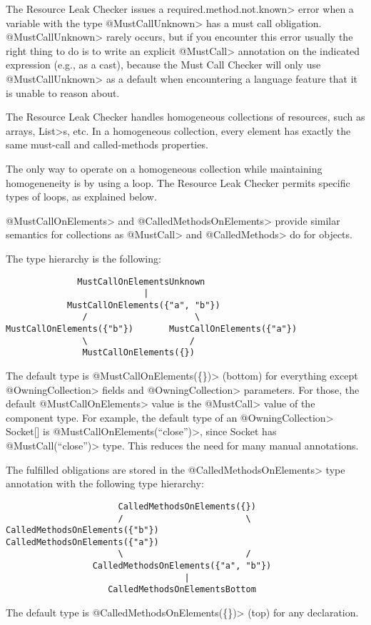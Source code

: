 The Resource Leak Checker issues a \<required.method.not.known> error
when a variable with the type \<@MustCallUnknown> has a must call obligation.
\<@MustCallUnknown> rarely occurs, but if you encounter this error usually
the right thing to do is to write an explicit \<@MustCall> annotation
on the indicated expression (e.g., as a cast), because the Must Call Checker
will only use \<@MustCallUnknown> as a default when encountering a language
feature that it is unable to reason about.



The Resource Leak Checker handles homogeneous collections of resources,
such as arrays, \<List>s, etc.  In a homogeneous collection, every element
has exactly the same must-call and called-methods properties.

The only way to operate on a homogeneous collection while maintaining
homogeneneity is by using a loop.  The Resource Leak Checker permits
specific types of loops, as explained below.


\<@MustCallOnElements> and \<@CalledMethodsOnElements> provide similar semantics for collections as \<@MustCall> and \<@CalledMethods> do for objects.

The type hierarchy is the following:

\begin{verbatim}
              MustCallOnElementsUnknown
                           |
            MustCallOnElements({"a", "b"})
               /                     \
MustCallOnElements({"b"})       MustCallOnElements({"a"})
               \                    /
               MustCallOnElements({})
\end{verbatim}
The default type is \<@MustCallOnElements(\{\})> (bottom) for everything except \<@OwningCollection> fields and \<@OwningCollection> parameters. For those, the default \<@MustCallOnElements> value is the \<@MustCall> value of the component type. For example, the default type of an \<@OwningCollection> Socket[] is \<@MustCallOnElements({``close''})>, since Socket has \<@MustCall(``close'')> type. This reduces the need for many manual annotations.

The fulfilled obligations are stored in the \<@CalledMethodsOnElements> type annotation with the following type hierarchy:
\begin{verbatim}
                      CalledMethodsOnElements({})
                      /                        \
CalledMethodsOnElements({"b"})           CalledMethodsOnElements({"a"})
                      \                        /
                 CalledMethodsOnElements({"a", "b"})
                                   |
                    CalledMethodsOnElementsBottom
\end{verbatim}
The default type is \<@CalledMethodsOnElements(\{\})> (top) for any declaration.



